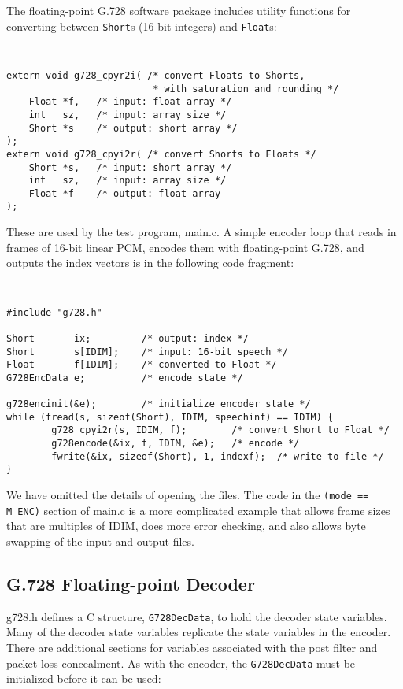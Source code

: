 The floating-point G.728 software package includes utility functions for
converting between {\tt Short}s (16-bit integers) and {\tt Float}s:

{\tt\small
\begin{verbatim}
extern void g728_cpyr2i( /* convert Floats to Shorts,
                          * with saturation and rounding */
    Float *f,   /* input: float array */
    int   sz,   /* input: array size */
    Short *s    /* output: short array */
);
extern void g728_cpyi2r( /* convert Shorts to Floats */
    Short *s,   /* input: short array */
    int   sz,   /* input: array size */
    Float *f    /* output: float array
);
\end{verbatim}
}

These are used by the test program, main.c. A simple encoder loop
that reads in frames of 16-bit linear PCM, encodes them
with floating-point G.728, and outputs the index vectors is in
the following code fragment:

{\tt\small
\begin{verbatim}
#include "g728.h"

Short       ix;         /* output: index */
Short       s[IDIM];    /* input: 16-bit speech */
Float       f[IDIM];    /* converted to Float */
G728EncData e;          /* encode state */

g728encinit(&e);        /* initialize encoder state */
while (fread(s, sizeof(Short), IDIM, speechinf) == IDIM) {
        g728_cpyi2r(s, IDIM, f);        /* convert Short to Float */
        g728encode(&ix, f, IDIM, &e);   /* encode */
        fwrite(&ix, sizeof(Short), 1, indexf);  /* write to file */
}
\end{verbatim}
}

We have omitted the details of opening the files. The code in the
{\tt (mode == M\_ENC)} section of main.c is a more complicated example that
allows frame sizes that are multiples of IDIM, does more error checking,
and also allows byte swapping of the input and output files.

\subsection {G.728 Floating-point Decoder}

g728.h defines a C structure, {\tt G728DecData}, to hold the decoder
state variables. Many of the decoder state variables replicate
the state variables in the encoder. There are additional
sections for variables associated with the post filter and
packet loss concealment. As with the encoder, the {\tt G728DecData}
must be initialized before it can be used:

